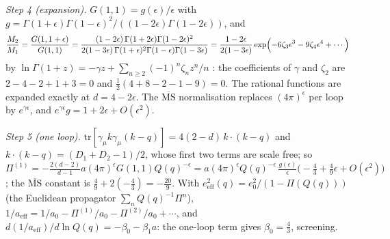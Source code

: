 \emph{Step 4 (expansion).} $G(1,1) = g(\epsilon)/\epsilon$ with $g = \Gamma(1+\epsilon)\Gamma(1-\epsilon)^{2}/((1-2\epsilon)\Gamma(1-2\epsilon))$, and
\[
\frac{M_{2}}{M_{1}} = \frac{G(1, 1+\epsilon)}{G(1,1)} = \frac{(1 - 2\epsilon)\,\Gamma(1+2\epsilon)\Gamma(1-2\epsilon)^{2}}{2(1 - 3\epsilon)\,\Gamma(1+\epsilon)^{2}\Gamma(1-\epsilon)\Gamma(1-3\epsilon)} = \frac{1 - 2\epsilon}{2(1 - 3\epsilon)}\exp\Bigl(-6\zeta_{3}\epsilon^{3} - 9\zeta_{4}\epsilon^{4} + \cdots\Bigr)
\]
by $\ln\Gamma(1 + z) = -\gamma z + \sum_{n \ge 2}(-1)^{n}\zeta_{n}z^{n}/n$ \cite{AbramowitzStegun1964}: the coefficients of $\gamma$ and $\zeta_{2}$ are $2 - 4 - 2 + 1 + 3 = 0$ and $\tfrac12(4 + 8 - 2 - 1 - 9) = 0$. The rational functions are expanded exactly at $d = 4 - 2\epsilon$. The $\overline{\mathrm{MS}}$ normalisation replaces $(4\pi)^{\epsilon}$ per loop by $e^{\gamma\epsilon}$, and $e^{\gamma\epsilon}g = 1 + 2\epsilon + O(\epsilon^{2})$.

\emph{Step 5 (one loop).} $\mathrm{tr}[\gamma_{\mu}k\gamma_{\mu}(k - q)] = 4(2 - d)\,k\cdot(k - q)$ and $k\cdot(k - q) = (D_{1} + D_{2} - 1)/2$, whose first two terms are scale free; so $\Pi^{(1)} = -\tfrac{2(d-2)}{d-1}a(4\pi)^{\epsilon}G(1,1)Q(q)^{-\epsilon} = a(4\pi)^{\epsilon}Q(q)^{-\epsilon}\,\tfrac{g(\epsilon)}{\epsilon}\bigl(-\tfrac43 + \tfrac49\epsilon + O(\epsilon^{2})\bigr)$; the $\overline{\mathrm{MS}}$ constant is $\tfrac49 + 2(-\tfrac43) = -\tfrac{20}{9}$. With $e^{2}_{\mathrm{eff}}(q) = e_{0}^{2}/(1 - \Pi(Q(q)))$ (the Euclidean propagator $\sum_{n}Q(q)^{-1}\Pi^{n}$), $1/a_{\mathrm{eff}} = 1/a_{0} - \Pi^{(1)}/a_{0} - \Pi^{(2)}/a_{0} + \cdots$, and $d(1/a_{\mathrm{eff}})/d\ln Q(q) = -\beta_{0} - \beta_{1}a$: the one-loop term gives $\beta_{0} = \tfrac43$, screening.

